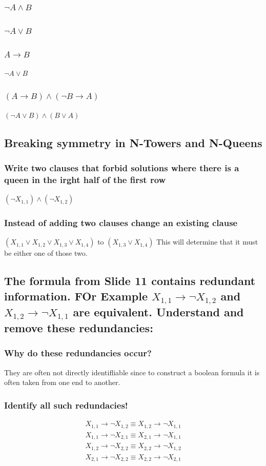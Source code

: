 \documentclass[12pt, a4paper]{article}
\begin{document}
			\subsubsection{$\neg A\land B$}
			\subsubsection{$\neg A\lor B$}
			\subsubsection{$A\rightarrow B$}
				$\neg A \lor B$
			\subsubsection{$(A\rightarrow B)\land(\neg B\rightarrow A)$}
				$(\neg A \lor B)\land (B\lor A)$\\
		\subsection{Breaking symmetry in N-Towers and N-Queens}
			\subsubsection{Write two clauses that forbid solutions where there is a queen in the irght half of the first row}
				$(\neg X_{1,1})\land (\neg X_{1,2})$
			\subsubsection{Instead of adding two clauses change an existing clause}
				$(X_{1,1}\lor X_{1,2}\lor X_{1,3} \lor X_{1,4})$ to $(X_{1,3}\lor X_{1,4})$
				This will determine that it must be either one of those two.
		\setcounter{subsection}{5}
		\subsection{The formula from Slide 11 contains redundant information. FOr Example $X_{1,1}\rightarrow\neg X_{1,2}$ and $X_{1,2}\rightarrow \neg X_{1,1}$ are equivalent. Understand and remove these redundancies:}
			\subsubsection{Why do these redundancies occur?}
				They are often not directly identifliable since to construct a boolean formula it is often taken from one end to another.
			\subsubsection{Identify all such redundacies!}
				\begin{align*}
					X_{1,1}\rightarrow \neg X_{1,2}\equiv X_{1,2}\rightarrow \neg X_{1,1}\\
					X_{1,1}\rightarrow \neg X_{2,1} \equiv X_{2,1}\rightarrow \neg X_{1,1}\\
					X_{1,2}\rightarrow \neg X_{2,2} \equiv X_{2,2}\rightarrow \neg X_{1,2}\\
					X_{2,1}\rightarrow \neg X_{2,2}\equiv X_{2,2}\rightarrow \neg X_{2,1}
				\end{align*}
\end{document}
